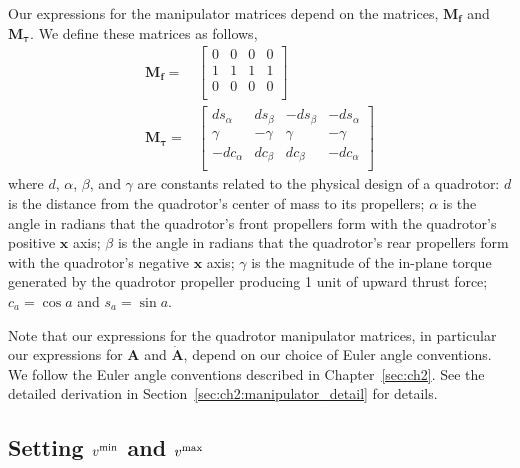 Our expressions for the manipulator matrices depend on the matrices, $\mathbf{M}_{\mathbf{f}}$ and $\mathbf{M}_{\mathbf{\tau}}$.
We define these matrices as follows, 
%
\begin{equation}
\begin{aligned}
%
\mathbf{M}_{\mathbf{f}} = &
\begin{bmatrix}
0 & 0 & 0 & 0 \\
1 & 1 & 1 & 1 \\
0 & 0 & 0 & 0 \\
\end{bmatrix}\\
%
\mathbf{M}_{\mathbf{\tau}} = &
\begin{bmatrix}
 ds_\alpha & ds_\beta & -ds_\beta & -ds_\alpha \\
\gamma     & -\gamma  & \gamma    & -\gamma    \\
-dc_\alpha & dc_\beta & dc_\beta  & -dc_\alpha \\
\end{bmatrix}
%
\end{aligned}
\end{equation}
%
where $d$, $\alpha$, $\beta$, and $\gamma$ are constants related to the physical design of a quadrotor:
$d$ is the distance from the quadrotor's center of mass to its propellers;
$\alpha$ is the angle in radians that the quadrotor's front propellers form with the quadrotor's positive $\mathbf{x}$ axis;
$\beta$ is the angle in radians that the quadrotor's rear propellers form with the quadrotor's negative $\mathbf{x}$ axis;
$\gamma$ is the magnitude of the in-plane torque generated by the quadrotor propeller producing 1 unit of upward thrust force;
$c_a=\cos a$ and $s_a=\sin a$.

Note that our expressions for the quadrotor manipulator matrices, in particular our expressions for $\mathbf{A}$ and $\mathbf{\dot{A}}$, depend on our choice of Euler angle conventions.
We follow the Euler angle conventions described in Chapter~\ref{sec:ch2}.
See the detailed derivation in Section~\ref{sec:ch2:manipulator_detail} for details.

\subsection{Setting $v^{\text{\textrm{\textmd{min}}}}$ and $v^{\text{\textrm{\textmd{max}}}}$}
\label{sec:ch3:v_min_v_max}

